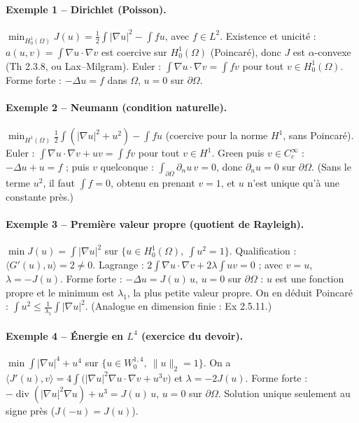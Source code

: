 \documentclass[10pt,a4paper]{article}
\newcommand{\sca}[2]{\langle #1,#2\rangle}
\newcommand{\nr}[1]{\|#1\|}
\renewcommand{\div}{\operatorname{div}}
\newcommand{\Hz}{H^1_0(\Omega)}
\begin{document}
\paragraph{Exemple 1 -- Dirichlet (Poisson).} $\min_{\Hz}J(u)=\frac12\int|\nabla u|^2-\int fu$, avec $f\in L^2$.
Existence et unicité : $a(u,v)=\int\nabla u\cdot\nabla v$ est coercive sur $\Hz$ (Poincaré), donc $J$ est $\alpha$-convexe (Th 2.3.8, ou Lax--Milgram).
Euler : $\int\nabla u\cdot\nabla v=\int fv$ pour tout $v\in\Hz$. Forme forte : $-\Delta u=f$ dans $\Omega$, $u=0$ sur $\partial\Omega$.

\paragraph{Exemple 2 -- Neumann (condition naturelle).} $\min_{H^1(\Omega)}\frac12\int(|\nabla u|^2+u^2)-\int fu$ (coercive pour la norme $H^1$, sans Poincaré).
Euler : $\int\nabla u\cdot\nabla v+uv=\int fv$ pour tout $v\in H^1$. Green puis $v\in C^\infty_c$ : $-\Delta u+u=f$ ; puis $v$ quelconque : $\int_{\partial\Omega}\partial_nu\,v=0$, donc $\partial_nu=0$ sur $\partial\Omega$.
(Sans le terme $u^2$, il faut $\int f=0$, obtenu en prenant $v=1$, et $u$ n'est unique qu'à une constante près.)

\paragraph{Exemple 3 -- Première valeur propre (quotient de Rayleigh).}\label{ex:rayleigh}
$\min J(u)=\int|\nabla u|^2$ sur $\{u\in\Hz,\ \int u^2=1\}$. Qualification : $\sca{G'(u)}u=2\ne0$.
Lagrange : $2\int\nabla u\cdot\nabla v+2\lambda\int uv=0$ ; avec $v=u$, $\lambda=-J(u)$.
Forme forte : $-\Delta u=J(u)\,u$, $u=0$ sur $\partial\Omega$ : $u$ est une fonction propre et le minimum est $\lambda_1$, la plus petite valeur propre. On en déduit Poincaré : $\int u^2\le\frac1{\lambda_1}\int|\nabla u|^2$. (Analogue en dimension finie : Ex 2.5.11.)

\paragraph{Exemple 4 -- Énergie en $L^4$ (exercice du devoir).} $\min\int|\nabla u|^4+u^4$ sur $\{u\in W^{1,4}_0,\ \nr u_2=1\}$.
On a $\sca{J'(u)}v=4\int\big(|\nabla u|^2\nabla u\cdot\nabla v+u^3v\big)$ et $\lambda=-2J(u)$.
Forme forte : $-\div(|\nabla u|^2\nabla u)+u^3=J(u)\,u$, $u=0$ sur $\partial\Omega$. Solution unique seulement au signe près ($J(-u)=J(u)$).
\end{document}
